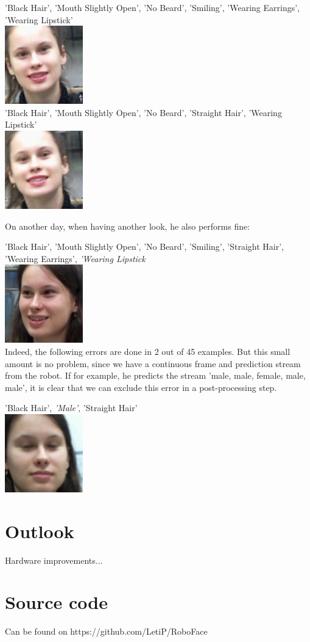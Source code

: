 \documentclass[12.5pt]{scrartcl}
\begin{document}
	'Black Hair', 'Mouth Slightly Open', 'No Beard', 'Smiling', 'Wearing Earrings', 'Wearing Lipstick' \\
	\includegraphics[height=0.1\textheight]{images/leti_normalised110} \\ 
	'Black Hair', 'Mouth Slightly Open', 'No Beard', 'Straight Hair', 'Wearing Lipstick' \\
	\includegraphics[height=0.1\textheight]{images/leti_normalised111} 
	
	On another day, when having another look, he also performs fine:
	
	'Black Hair', 'Mouth Slightly Open', 'No Beard', 'Smiling', 'Straight Hair', 'Wearing Earrings', \emph{'Wearing Lipstick}
	 \\
	\includegraphics[height=0.1\textheight]{images/leti_normalised24}\\
	
	Indeed, the following errors are done in 2 out of 45 examples. But this small amount is no problem, since we have a continuous frame and prediction stream from the robot. If for example, he predicts the stream 'male, male, female, male, male', it is clear that we can exclude this error in a post-processing step.
	
	'Black Hair', \emph{'Male'}, 'Straight Hair'\\
	\includegraphics[height=0.1\textheight]{images/leti_normalised0}
	\section{Outlook}
	Hardware improvements...
	\section{Source code}
	Can be found on	https://github.com/LetiP/RoboFace
	
\end{document}
